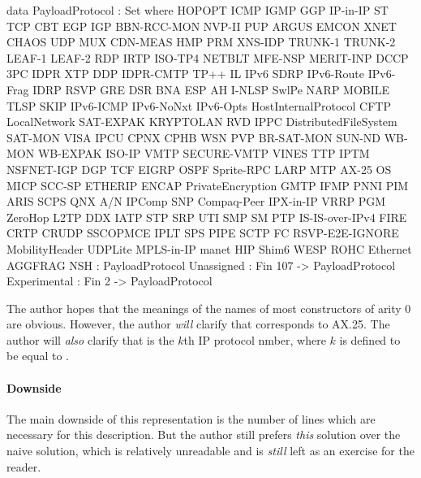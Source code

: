 \documentclass{report}
\begin{document}
\begin{code}
  data PayloadProtocol : Set
    where
    HOPOPT
     ICMP
     IGMP
     GGP
     IP-in-IP
     ST
     TCP
     CBT
     EGP
     IGP
     BBN-RCC-MON
     NVP-II
     PUP
     ARGUS
     EMCON
     XNET
     CHAOS
     UDP
     MUX
     CDN-MEAS
     HMP
     PRM
     XNS-IDP
     TRUNK-1
     TRUNK-2
     LEAF-1
     LEAF-2
     RDP
     IRTP
     ISO-TP4
     NETBLT
     MFE-NSP
     MERIT-INP
     DCCP
     3PC
     IDPR
     XTP
     DDP
     IDPR-CMTP
     TP++
     IL
     IPv6
     SDRP
     IPv6-Route
     IPv6-Frag
     IDRP
     RSVP
     GRE
     DSR
     BNA
     ESP
     AH
     I-NLSP
     SwlPe
     NARP
     MOBILE
     TLSP
     SKIP
     IPv6-ICMP
     IPv6-NoNxt
     IPv6-Opts
     HostInternalProtocol
     CFTP
     LocalNetwork
     SAT-EXPAK
     KRYPTOLAN
     RVD
     IPPC
     DistributedFileSystem
     SAT-MON
     VISA
     IPCU
     CPNX
     CPHB
     WSN
     PVP
     BR-SAT-MON
     SUN-ND
     WB-MON
     WB-EXPAK
     ISO-IP
     VMTP
     SECURE-VMTP
     VINES
     TTP
     IPTM
     NSFNET-IGP
     DGP
     TCF
     EIGRP
     OSPF
     Sprite-RPC
     LARP
     MTP
     AX-25
     OS
     MICP
     SCC-SP
     ETHERIP
     ENCAP
     PrivateEncryption
     GMTP
     IFMP
     PNNI
     PIM
     ARIS
     SCPS
     QNX
     A/N
     IPComp
     SNP
     Compaq-Peer
     IPX-in-IP
     VRRP
     PGM
     ZeroHop
     L2TP
     DDX
     IATP
     STP
     SRP
     UTI
     SMP
     SM
     PTP
     IS-IS-over-IPv4
     FIRE
     CRTP
     CRUDP
     SSCOPMCE
     IPLT
     SPS
     PIPE
     SCTP
     FC
     RSVP-E2E-IGNORE
     MobilityHeader
     UDPLite
     MPLS-in-IP
     manet
     HIP
     Shim6
     WESP
     ROHC
     Ethernet
     AGGFRAG
     NSH : PayloadProtocol
    Unassigned : Fin 107 -> PayloadProtocol
    Experimental : Fin 2 -> PayloadProtocol
\end{code}

The author hopes that the meanings of the names of most constructors of arity 0 are obvious.  However, the author \emph{will} clarify that  corresponds to AX.25.  The author will \emph{also} clarify that   is the \(k\)th IP protocol nmber, where \(k\) is defined to be equal to  \AgdaOperator{\AgdaFunction{+}}  .

\paragraph{Downside}
The main downside of this representation is the number of lines which are necessary for this description.  But the author still prefers \emph{this} solution over the naive solution, which is relatively unreadable and is \emph{still} left as an exercise for the reader.
\end{document}
